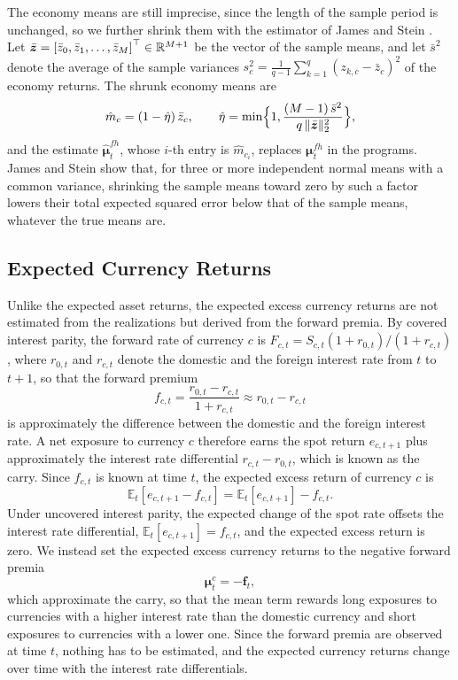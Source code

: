 The economy means are still imprecise, since the length of the sample period is unchanged, so we further shrink them with the estimator of James and Stein \cite{JamesStein1961}. Let $\bar{\bm{z}} = \left[\bar{z}_0, \bar{z}_1, \ldots, \bar{z}_M\right]^\top \in \mathbb{R}^{M+1}$ be the vector of the
sample means, and let $\bar{s}^2$ denote the average of the sample variances
$s_c^2 = \frac{1}{q-1} \sum_{k=1}^q (z_{k,c} - \bar{z}_c)^2$ of the economy returns. The shrunk economy means are
\begin{equation*}
    \hat{m}_c = (1 - \hat{\eta})\, \bar{z}_c,
    \qquad
    \hat{\eta} = \min\Bigl\{ 1, \frac{(M - 1)\, \bar{s}^2}{q\, \|\bar{\bm{z}}\|_2^2} \Bigr\},
\end{equation*}
and the estimate $\hat{\bm{\mu}}^{fh}_t$, whose $i$-th entry is $\hat{m}_{c_i}$, replaces $\bm{\mu}^{fh}_t$ in the
programs. James and Stein show that, for three or more independent normal means with a common variance, shrinking the
sample means toward zero by such a factor lowers their total expected squared error below that of the sample means,
whatever the true means are. 

\subsection{Expected Currency Returns}\label{sec:expected-currency-returns}

Unlike the expected asset returns, the expected excess currency returns are not estimated from the realizations but
derived from the forward premia. By covered interest parity, the forward rate of currency $c$ is
$F_{c,t} = S_{c,t} (1 + r_{0,t}) / (1 + r_{c,t})$, where $r_{0,t}$ and $r_{c,t}$ denote the domestic and the foreign
interest rate from $t$ to $t+1$, so that the forward premium
\begin{equation*}
    f_{c,t} = \frac{r_{0,t} - r_{c,t}}{1 + r_{c,t}} \approx r_{0,t} - r_{c,t}
\end{equation*}
is approximately the difference between the domestic and the foreign interest rate. A net exposure to currency $c$ 
therefore earns the spot return $e_{c,t+1}$ plus approximately the interest rate differential $r_{c,t} - r_{0,t}$,
which is known as the carry. Since $f_{c,t}$ is known at time $t$, the expected excess return of currency $c$ is
\begin{equation*}
    \mathbb{E}_t[e_{c,t+1} - f_{c,t}] = \mathbb{E}_t[e_{c,t+1}] - f_{c,t}.
\end{equation*}
Under uncovered interest parity, the expected change of the spot rate offsets the interest rate differential,
$\mathbb{E}_t[e_{c,t+1}] = f_{c,t}$, and the expected excess return is zero. We 
instead set the expected excess currency returns to the negative forward premia
\begin{equation*}
    \bm{\mu}^c_t = -\bm{f}_t,
\end{equation*}
which approximate the carry, so that the mean term rewards long exposures to currencies with a higher interest rate
than the domestic currency and short exposures to currencies with a lower one. Since the forward
premia are observed at time $t$, nothing has to be estimated, and the expected currency returns change over time with
the interest rate differentials.

